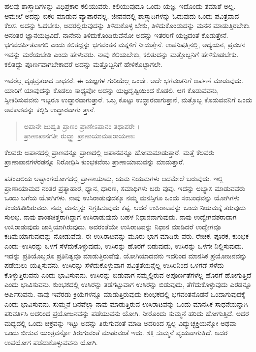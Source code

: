 ಹಲವು ಶಾಸ್ತ್ರಾದಿಗಳನ್ನು ವಿಧಿಪ್ರಕಾರ ಕಲಿಯುವರು. ಕಲಿಯುವುದೂ ಒಂದು ಯಜ್ಞ, ಇದೊಂದು ತಮಾಶೆ ಅಲ್ಲ. ಆಮೇಲೆ ಅದನ್ನು ಬಿಕರಿ ಮಾಡುವ ವ್ಯಾಪಾರವಲ್ಲ. ಜೀವನದಲ್ಲಿ ಶಾಸ್ತ್ರಾದಿಗಳನ್ನು ಓದುವುದು ಒಂದು ಪವಿತ್ರವಾದ ಕೆಲಸ. ಅದನ್ನು ಓದಬೇಕು, ಅದರಲ್ಲಿರುವುದನ್ನು ತಿಳಿದುಕೊಳ್ಳ ಬೇಕು, ತಿಳಿದುಕೊಂಡುದನ್ನು ಮನನ ಮಾಡುತ್ತಿರಬೇಕು. ಅನಂತರ ಜ್ಞಾನಯಜ್ಞವಿದೆ. ನಾನೇನು ತಿಳಿದುಕೊಂಡಿರುವೆನೋ ಅದನ್ನು ಇತರರಿಗೆ ಯಜ್ಞದಂತೆ ಕೊಡುತ್ತೇನೆ. ಭಗವದರ್ಪಿತವಾಗಲಿ ಎಂದು ಕಲಿತದ್ದನ್ನು ಭಗವಂತನ ಮಕ್ಕಳಿಗೆ ನೀಡುತ್ತೇನೆ. ಉಪನಿಷತ್ತಿನಲ್ಲಿ, ಅಧ್ಯಯನ, ಪ್ರವಚನ ಇವನ್ನು ಮರೆಯಬೇಡಿ ಎಂದು ಹೇಳುವರು. ನಾವು ಕಲಿಯಬೇಕು, ಕಲಿತುದನ್ನು ಮತ್ತೊಬ್ಬನಿಗೆ ಹೇಳಿಕೊಡಬೇಕು. ಕಲಿತದ್ದು ಪೂರ್ಣವಾಗಬೇಕಾದರೆ ಅದನ್ನು ಮತ್ತೊಬ್ಬನಿಗೆ ಹೇಳಿಕೊಟ್ಟಾಗಲೇ.

ಇವರೆಲ್ಲ ದೃಢವ್ರತರಾದ ಸಾಧಕರೆ. ಈ ಯಜ್ಞಗಳ ಗುರಿಯೆಲ್ಲ ಒಂದೇ. ಅದೇ ಭಗವಂತನಿಗೆ ಅರ್ಪಣೆ ಮಾಡುವುದು. ಯಾರಿಗೆ ಯಾವುದನ್ನು ಕೊಡಲು ಸಾಧ್ಯವೋ ಅದನ್ನು ಯಜ್ಞದೃಷ್ಟಿಯಿಂದ ಕೊಡಲಿ. ಆಗ ಕೊಡುವವನು, ಸ್ವೀಕರಿಸುವವನು ಇಬ್ಬರೂ ಉದ್ಧಾರವಾಗುತ್ತಾರೆ. ಒಬ್ಬ ಕೊಟ್ಟು ಉದ್ಧಾರವಾಗುತ್ತಾನೆ, ಮತ್ತೊಬ್ಬ ಕೊಡುವವನಿಗೆ ಒಂದು ಅವಕಾಶವನ್ನು ಕಲ್ಪಿಸಿ ಉದ್ಧಾರವಾಗು ತ್ತಾನೆ.

\begin{verse}
ಅಪಾನೇ ಜುಹ್ವತಿ ಪ್ರಾಣಂ ಪ್ರಾಣೇಽಪಾನಂ ತಥಾಪರೇ ।\\ಪ್ರಾಣಾಪಾನಗತೀ ರುದ್ಧ್ವಾ ಪ್ರಾಣಾಯಾಮಪರಾಯಣಾಃ 
\end{verse}

{\small ಕೆಲವರು ಅಪಾನದಲ್ಲಿ ಪ್ರಾಣವನ್ನೂ ಪ್ರಾಣದಲ್ಲಿ ಅಪಾನವನ್ನೂ ಹೋಮಮಾಡುತ್ತಾರೆ. ಮತ್ತೆ ಕೆಲವರು ಪ್ರಾಣಾಪಾನಗಳೆರಡನ್ನೂ ನಿರೋಧಿಸಿ ಕುಂಭಕವೆಂಬ ಪ್ರಾಣಾಯಾಮವನ್ನು ಮಾಡುತ್ತಾರೆ.}

ಪತಂಜಲಿಯ ಅಷ್ಟಾಂಗಯೋಗದಲ್ಲಿ ಪ್ರಾಣಾಯಾಮ, ಯಮ ನಿಯಮಗಳು ಆದಮೇಲೆ ಬರುವುದು. ಇಲ್ಲಿ ಪ್ರಾಣಾಯಾಮದ ನಂತರ ಪ್ರತ್ಯಾಹಾರ, ಧ್ಯಾನ, ಧಾರಣ, ಸಮಾಧಿಗಳು ಬರು ವುವು. ಇದನ್ನು ಅಭ್ಯಾಸ ಮಾಡುವವರು ಒಂದು ಬಗೆಯ ಯೋಗಿಗಳು. ನಾವು ಉಸಿರಾಡುವುದಕ್ಕೂ ನಮ್ಮ ಮನಸ್ಸಿಗೂ ಒಂದು ಸಂಬಂಧವನ್ನು ಯೋಗಿಗಳು ಕಂಡುಹಿಡಿದಿರುವರು. ನಮ್ಮ ಮನಸ್ಸನ್ನು ನಿಗ್ರಹಿಸುವುದು ಕಷ್ಟ. ಆದರೆ ಉಸಿರಾಟವನ್ನು ಒಂದು ನಿಯಮಕ್ಕೆ ತರುವುದು ಸುಲಭ. ನಾವು ಶಾಂತಚಿತ್ತರಾಗಿದ್ದಾಗ ಉಸಿರಾಡುವುದು ಬಹಳ ನಿಧಾನವಾಗುವುದು. ನಾವು ಉದ್ವೇಗವಶರಾದಾಗ ಉಸಿರಾಡುವುದು ಜಾಸ್ತಿಯಾಗಿರುವುದು. ಅದರಂತೆಯೇ ಉಸಿರಾಟವನ್ನು ನಿಧಾನ ಮಾಡಿದರೆ ಉದ್ವೇಗವೂ ಕಡಿಮೆಯಾಗುವುದನ್ನು ನೋಡುವೆವು. ಈ ಉಸಿರಾಟವನ್ನು ಮೂರು ಭಾಗ ಮಾಡಿರು ವರು. ರೇಚಕ, ಪೂರಕ, ಕುಂಭಕ ಎಂದು–ಉಸಿರನ್ನು ಒಳಗೆ ಸೆಳೆದುಕೊಳ್ಳುವುದು, ಉಸಿರನ್ನು ಹೊರಗೆ ಬಿಡುವುದು, ಉಸಿರನ್ನು ಒಳಗೇ ನಿಲ್ಲಿಸುವುದು. ಇದನ್ನು ಪ್ರತಿಯೊಬ್ಬರೂ ಪ್ರತಿನಿತ್ಯವೂ ಮಾಡುತ್ತಿರುವೆವು. ಯೋಗಿಯಾದವನು ಇದರಿಂದ ಮಾನಸಿಕ ಪ್ರಯೋಜನವನ್ನು ಪಡೆಯಲು ಯತ್ನಿಸುವನು. ಉಸಿರನ್ನು ಸೆಳೆದುಕೊಳ್ಳುವಾಗ ಪವಿತ್ರತೆಯನ್ನೆಲ್ಲ ಉಸಿರಿನಿಂದ ಒಳಗಡೆ ಸೆಳೆದು ಕೊಳ್ಳುತ್ತಿರುವನು ಎಂದು ಭಾವಿಸುವನು. ಉಸಿರನ್ನು ಬಿಡುವಾಗ ನಮ್ಮಲ್ಲಿರುವ ಅಪೂರ್ಣತೆಗಳೆಲ್ಲ ಹೊರಗೆ ಹೋಗುತ್ತಿದೆ ಎಂದು ಭಾವಿಸುವನು. ಕುಂಭಕದಲ್ಲಿ ಉಸಿರನ್ನು ತಡೆಗಟ್ಟುವಾಗ ಉಸಿರನ್ನು ಬಿಡುವುದು, ತೆಗೆದುಕೊಳ್ಳುವುದು ಎರಡನ್ನೂ ಅರ್ಪಿಸುವನು. ನಾವು ಇವೆರಡು ಕ್ರಿಯೆಗಳನ್ನೂ ಮಾಡುತ್ತಿರುವುದು ಕುಂಭಕದಲ್ಲಿ ಭಗವಂತನೊಡನೆ ಒಂದಾಗುವುದಕ್ಕೆ ಎಂದು ಭಾವಿಸುವನು. ಸುಮ್ಮನೆ ದಿನವೆಲ್ಲಾ ನಾವು ಮಾಡುತ್ತಿರುವ ಉಸಿರಾಟವನ್ನು ಒಂದು ಮಾನಸಿಕ ಸಾಧನೆಯನ್ನಾಗಿ ಪರಿವರ್ತಿಸಿ ಅದರಿಂದ ಪ್ರಯೋಜನವನ್ನು ಪಡೆಯುವನು ಯೋಗಿ. ನೀರೊಂದು ಸುಮ್ಮನೆ ಹರಿದು ಹೋಗುತ್ತಿದೆ. ಅದರ ಮಧ್ಯದಲ್ಲಿ ಒಂದು ಚಕ್ರವನ್ನು ಇಟ್ಟು ಅದನ್ನು ತಿರುಗುವಂತೆ ಮಾಡಿ ಅದರಿಂದ ಸ್ವಲ್ಪ ವಿದ್ಯುಚ್ಛಕ್ತಿಯನ್ನೋ ಅಥವಾ ಒಂದು ಬೀಸುವ ಯಂತ್ರವನ್ನೋ ತಿರುಗುವಂತೆ ಮಾಡುವಂತೆ ಇದು. ಶಕ್ತಿ ಸುಮ್ಮನೆ ವ್ಯಯವಾಗುತ್ತಿದೆ. ಅದರ ಉಪಯೋಗ ಪಡೆದುಕೊಳ್ಳುವವನು ಯೋಗಿ.

